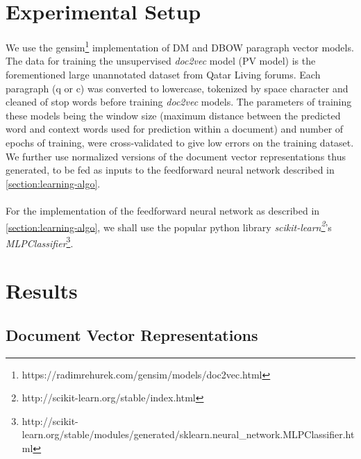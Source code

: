 \documentclass[12pt, a4paper, oneside]{Thesis} %
\begin{document}
\section{Experimental Setup}

We use the gensim\footnote{https://radimrehurek.com/gensim/models/doc2vec.html} implementation of DM and DBOW paragraph vector models. The data for training the unsupervised \textit{doc2vec} model (PV model) is the forementioned large unannotated dataset from Qatar Living forums. Each paragraph (q or c) was converted to lowercase, tokenized by space character and cleaned of stop words before training \textit{doc2vec} models. The parameters of training these models being the window size (maximum distance between the predicted word and context words used for prediction within a document) and number of epochs of training, were cross-validated to give low errors on the training dataset. We further use normalized versions of the document vector representations thus generated, to be fed as inputs to the feedforward neural network described in \autoref{section:learning-algo}. \\ \\
For the implementation of the feedforward neural network as described in \autoref{section:learning-algo}, we shall use the popular python library \textit{scikit-learn\footnote{http://scikit-learn.org/stable/index.html}}'s \textit{MLPClassifier}\footnote{http://scikit-learn.org/stable/modules/generated/sklearn.neural\_network.MLPClassifier.html}.

\section{Results}

\subsection{Document Vector Representations}
\end{document}
